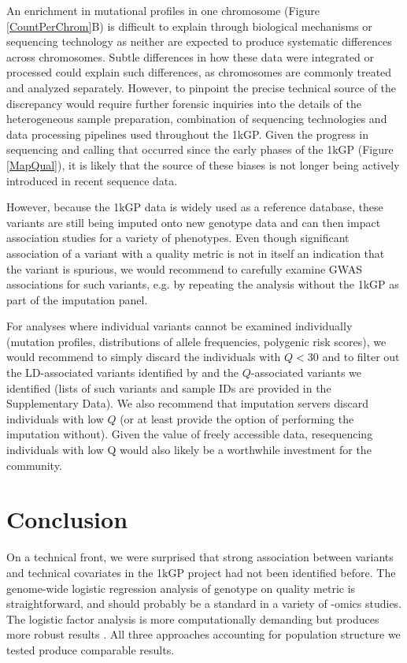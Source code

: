 \documentclass[9pt,article]{template}
\begin{document}
An enrichment in mutational profiles in one chromosome (Figure \ref{CountPerChrom}B) is difficult to explain through biological mechanisms or sequencing technology as neither are expected to produce systematic differences across chromosomes. 
Subtle differences in how these data were integrated or processed could explain such differences, as chromosomes are commonly treated and analyzed separately. 
However, to pinpoint the precise technical source of the discrepancy would require further forensic inquiries into the details of the heterogeneous sample preparation, combination of sequencing technologies and data processing pipelines used throughout the 1kGP. 
Given the progress in sequencing and calling that occurred since the early phases of the 1kGP (Figure \ref{MapQual}), it is likely that the source of these biases is not longer being actively introduced in recent sequence data.

However, because the 1kGP data is widely used as a reference database, these variants are still being imputed onto new genotype data and can then impact association studies for a variety of phenotypes. 
Even though significant association of a variant with a quality metric is not in itself an indication that the variant is spurious, we would recommend to carefully examine GWAS associations for such variants, e.g. by repeating the analysis without the 1kGP as part of the imputation panel. 

For analyses where individual variants cannot be examined individually (mutation profiles, distributions of allele frequencies, polygenic risk scores), we would recommend to simply discard the individuals with $Q<30$ and to filter out the LD-associated variants identified by \cite{mafessoni2018turning} and the $Q$-associated variants we identified (lists of such variants and sample IDs are provided in the Supplementary Data). We also recommend that imputation servers discard individuals with low $Q$ (or at least provide the option of performing the imputation without). Given the value of freely accessible data, resequencing individuals with low Q would  also likely be a worthwhile investment for the community. 

\section{Conclusion}

On a technical front, we were surprised that strong association between variants and technical covariates in the 1kGP project had not been identified before. 
The genome-wide logistic regression analysis of genotype on quality metric is straightforward, and should probably be a standard in a variety of -omics studies. 
The logistic factor analysis is more computationally demanding but produces more robust results \citep{song2015testing}. 
All three approaches accounting for population structure we tested produce comparable results.  
\end{document}
